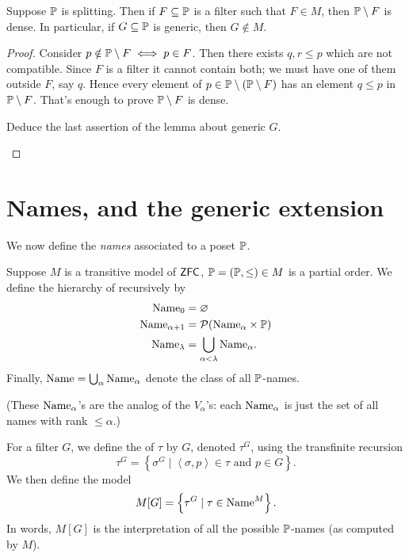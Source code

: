 \begin{lemma}
	Suppose $\mathbb P$ is splitting.  Then if $F \subseteq \mathbb P$ is a filter
	such that $F \in M$, then $\mathbb P \setminus F$ is dense.
	In particular, if $G \subseteq \mathbb P$ is generic, then $G \notin M$.
\end{lemma}
\begin{proof}
	Consider $p \notin \mathbb P \setminus F \iff p \in F$.
	Then there exists $q, r \le p$ which are not compatible.
	Since $F$ is a filter it cannot contain both;
	we must have one of them outside $F$, say $q$.
	Hence every element of $p \in \mathbb P \setminus (\mathbb P \setminus F)$
	has an element $q \le p$ in $\mathbb P \setminus F$.
	That's enough to prove $\mathbb P \setminus F$ is dense.
	\begin{ques}
		Deduce the last assertion of the lemma about generic $G$. \qedhere
	\end{ques}
\end{proof}

\section{Names, and the generic extension}
We now define the \emph{names} associated to a poset $\mathbb P$.

\begin{definition}
	Suppose $M$ is a transitive model of $\mathsf{ZFC}$, $\mathbb P = (\mathbb P, \le) \in M$ is a partial order.
	We define the hierarchy of  recursively by
	\begin{align*}
		\text{Name}_0 &= \varnothing \\
		\text{Name}_{\alpha+1} &= \mathcal P(\text{Name}_\alpha \times \mathbb P) \\
		\text{Name}_{\lambda} &= \bigcup_{\alpha < \lambda} \text{Name}_\alpha.
	\end{align*}
	Finally, $\text{Name} = \bigcup_\alpha \text{Name}_\alpha$ denote the class of all $\mathbb P$-names.
\end{definition}
(These $\text{Name}_\alpha$'s are the analog of the $V_\alpha$'s:
each $\text{Name}_\alpha$ is just the set of all names with rank $\le \alpha$.)

\begin{definition}
	For a filter $G$, we define the  of $\tau$ by $G$,
	denoted $\tau^G$, using the transfinite recursion
	\[ \tau^G
		= \left\{ \sigma^G
		\mid \left<\sigma, p\right> \in \tau
		\text{ and } p \in G\right\}. \]
	We then define the model
	\[ M[G] = \left\{ \tau^G \mid \tau \in \text{Name}^M \right\}. \]
	In words, $M[G]$ is the interpretation of all the possible $\mathbb P$-names
	(as computed by $M$).
\end{definition}

